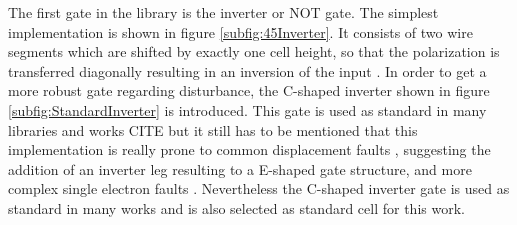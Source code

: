 The first gate in the library is the inverter or NOT gate. The simplest implementation is shown in figure \ref{subfig:45Inverter}. It consists of two wire segments which are shifted by exactly one cell height, so that the polarization is transferred diagonally resulting in an inversion of the input \cite{Sasamal2020QuantumDotCA}. In order to get a more robust gate regarding disturbance, the C-shaped inverter shown in figure \ref{subfig:StandardInverter} is introduced. This gate is used as standard in many libraries and works CITE but it still has to be mentioned that this implementation is really prone to common displacement faults \cite{Inverter_displacements}, suggesting the addition of an inverter leg resulting to a E-shaped gate structure, and more complex single electron faults \cite{SingelElectronFaults}. Nevertheless the C-shaped inverter gate is used as standard in many works and is also selected as standard cell for this work.\\
